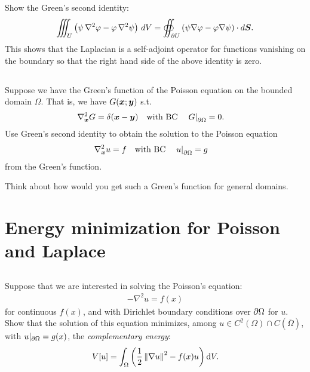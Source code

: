 \documentclass[11pt,letterpaper]{article}
\begin{document}
\subsection{}
Show the Green's second identity:
\begin{align}
    \iiint_U \left( \psi \, \nabla^2 \varphi - \varphi \, \nabla^2 \psi\right)\, dV = \oiint_{\partial U} \left( \psi \nabla \varphi - \varphi \nabla \psi\right)\cdot d\boldsymbol{S}.
\end{align}
This shows that the Laplacian is a self-adjoint operator for functions vanishing on the boundary so that the right hand side of the above identity is zero.

\subsection{}
Suppose we have the Green's function of the Poisson equation on the bounded domain $\Omega$. That is, we have $G(\boldsymbol{x};\boldsymbol{y})$ s.t.
\begin{align}
    &\nabla_{\boldsymbol{x}}^2 G = \delta(\boldsymbol{x}-\boldsymbol{y})\quad \mbox{with BC} \quad \left.G\right|_{\partial\Omega} = 0.
\end{align}
Use Green's second identity to obtain the solution to the Poisson equation
\begin{align}
    &\nabla_{\boldsymbol{x}}^2 u = f\quad \mbox{with BC} \quad \left.u\right|_{\partial\Omega} = g
\end{align}
from the Green's function.

Think about how would you get such a Green's function for general domains. 

\section{Energy minimization for Poisson and Laplace}
\subsection{} Suppose that we are interested in solving the Poisson's equation:
\begin{align}
    -\nabla^2 u = f(x)
\end{align}
for continuous $f(x)$, and with Dirichlet boundary conditions over $\partial\Omega$ for $u$. Show that the solution of this equation minimizes, among $u\in C^2(\Omega)\cap C(\overline{\Omega})$, with $u|_{\partial\Omega} = g(x)$, the \emph{complementary energy}:
\begin{align}
    V[u] = \int_\Omega \left(\frac{1}{2}\left\Vert \nabla u \right\Vert^2-f(x)u\right)\mathrm{d} V. 
\end{align}
\end{document}

